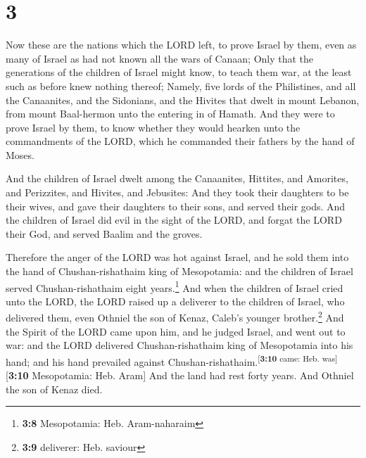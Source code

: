 \hypertarget{section-2}{%
\section{3}\label{section-2}}

 Now these are the nations which the LORD left, to prove
Israel by them, even as many of Israel as had not known all the wars of
Canaan;  Only that the generations of the children of
Israel might know, to teach them war, at the least such as before knew
nothing thereof;  Namely, five lords of the Philistines,
and all the Canaanites, and the Sidonians, and the Hivites that dwelt in
mount Lebanon, from mount Baal-hermon unto the entering in of Hamath.
 And they were to prove Israel by them, to know whether
they would hearken unto the commandments of the LORD, which he commanded
their fathers by the hand of Moses.

 And the children of Israel dwelt among the Canaanites,
Hittites, and Amorites, and Perizzites, and Hivites, and Jebusites:
 And they took their daughters to be their wives, and gave
their daughters to their sons, and served their gods.  And
the children of Israel did evil in the sight of the LORD, and forgat the
LORD their God, and served Baalim and the groves.

 Therefore the anger of the LORD was hot against Israel,
and he sold them into the hand of Chushan-rishathaim king of
Mesopotamia: and the children of Israel served Chushan-rishathaim eight
years.\footnote{\textbf{3:8} Mesopotamia: Heb. Aram-naharaim}
 And when the children of Israel cried unto the LORD, the
LORD raised up a deliverer to the children of Israel, who delivered
them, even Othniel the son of Kenaz, Caleb's younger brother.\footnote{\textbf{3:9}
  deliverer: Heb. saviour}  And the Spirit of the LORD
came upon him, and he judged Israel, and went out to war: and the LORD
delivered Chushan-rishathaim king of Mesopotamia into his hand; and his
hand prevailed against
Chushan-rishathaim.\textsuperscript{{[}\textbf{3:10} came: Heb.
was{]}}{[}\textbf{3:10} Mesopotamia: Heb. Aram{]}  And
the land had rest forty years. And Othniel the son of Kenaz died.

